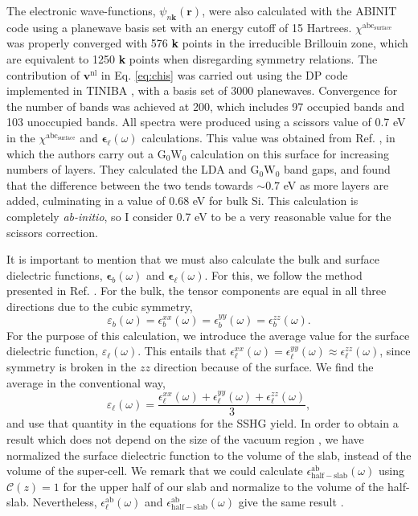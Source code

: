 The electronic wave-functions, $\psi_{n\mathbf{k}}(\mathbf{r})$, were also
calculated with the ABINIT code using a planewave basis set with an energy
cutoff of 15 Hartrees. $\chi^{\mathrm{abc}_{\mathrm{surface}}}$ was properly
converged with 576 \textbf{k} points in the irreducible Brillouin zone, which
are equivalent to 1250 \textbf{k} points when disregarding symmetry relations.
The contribution of $\mathbf{v}^\mathrm{nl}$ in Eq. \eqref{eq:chis} was carried
out using the DP \cite{olevanoDP} code implemented in TINIBA \cite{tiniba}, with
a basis set of 3000 planewaves. Convergence for the number of bands was achieved
at 200, which includes 97 occupied bands and 103 unoccupied bands. All spectra
were produced using a scissors value of 0.7 eV in the
$\chi^{\mathrm{abc}_{\mathrm{surface}}}$ and
$\boldsymbol{\epsilon}_{\ell}(\omega)$ calculations. This value was obtained
from Ref. \cite{liPRB10}, in which the authors carry out a
$\mathrm{G}_{0}\mathrm{W}_{0}$ calculation on this surface for increasing
numbers of layers. They calculated the LDA and $\mathrm{G}_{0}\mathrm{W}_{0}$
band gaps, and found that the difference between the two tends towards $\sim0.7$
eV as more layers are added, culminating in a value of 0.68 eV for bulk Si. This
calculation is completely \emph{ab-initio}, so I consider 0.7 eV to be a very
reasonable value for the scissors correction.

It is important to mention that we must also calculate the bulk and surface
dielectric functions, $\boldsymbol{\epsilon}_b(\omega)$ and
$\boldsymbol{\epsilon}_\ell(\omega)$. For this, we follow the method presented
in Ref. \cite{mendozaPRB06}. For the bulk, the tensor components are equal in
all three directions due to the cubic symmetry,
\begin{equation*}
\varepsilon_{b}(\omega) = 
\epsilon^{xx}_{b}(\omega) = 
\epsilon^{yy}_{b}(\omega) = 
\epsilon^{zz}_{b}(\omega).
\end{equation*}
For the purpose of this calculation, we introduce the average value for the
surface dielectric function, $\varepsilon_\ell(\omega)$. This entails that
$\epsilon^{xx}_{\ell}(\omega) = \epsilon^{yy}_{\ell}(\omega) \approx
\epsilon^{zz}_{\ell}(\omega)$, since symmetry is broken in the $zz$ direction
because of the surface. We find the average in the conventional way,
\begin{equation*}
\varepsilon_{\ell}(\omega) = 
\frac{\epsilon^{xx}_{\ell}(\omega) + 
\epsilon^{yy}_{\ell}(\omega) + 
\epsilon^{zz}_{\ell}(\omega)}{3},
\end{equation*}
and use that quantity in the equations for the SSHG yield. In order to obtain a
result which does not depend on the size of the vacuum region
\cite{nicolasPRB15}, we have normalized the surface dielectric function to the
volume of the slab, instead of the volume of the super-cell. We remark that we
could calculate $\epsilon^{\mathrm{ab}}_{\mathrm{half-slab}}(\omega)$ using
${\mathcal{C}}(z)=1$ for the upper half of our slab and normalize to the volume
of the half-slab. Nevertheless, $\epsilon^{\mathrm{ab}}_{\ell}(\omega)$ and
$\epsilon^{\mathrm{ab}}_{\mathrm{half-slab}}(\omega)$ give the same
result \cite{hoganPRB03, castilloPRB03, nicolasPRB15}.

